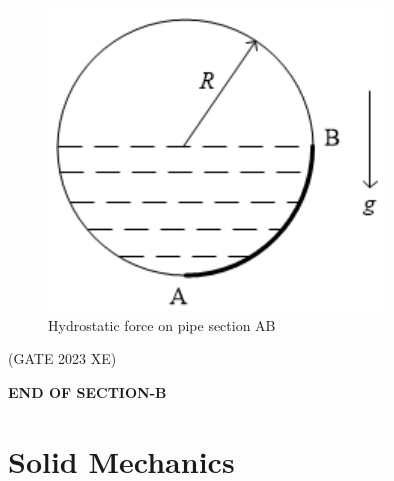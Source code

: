 \documentclass[journal,12pt,onecolumn]{IEEEtran}
\begin{document}
\begin{enumerate}
\begin{figure}[htbp]
\centering
\includegraphics[width=0.5\columnwidth]{figs/B/fig12.png}
\caption{Hydrostatic force on pipe section AB}
\label{fig:figs/B/fig12.png}
\end{figure}
\hfill{(GATE 2023 XE)}

\end{enumerate}

\begin{center}

\item[\textbf{END OF SECTION-B}]

\end{center}

\newpage


\section*{Solid Mechanics}
\end{document}

